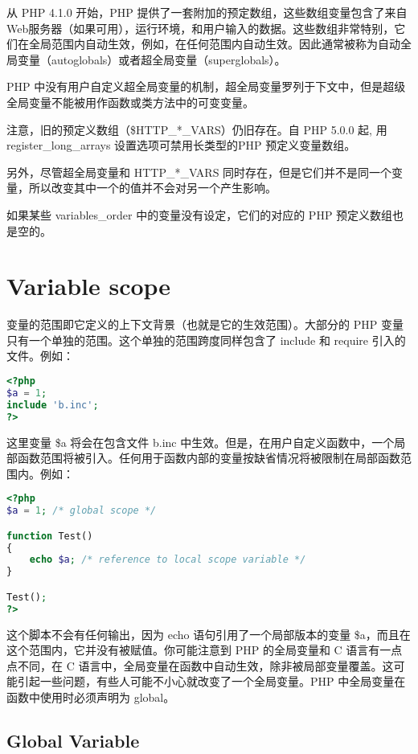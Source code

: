 从 PHP 4.1.0 开始，PHP 提供了一套附加的预定数组，这些数组变量包含了来自Web服务器（如果可用），运行环境，和用户输入的数据。这些数组非常特别，它们在全局范围内自动生效，例如，在任何范围内自动生效。因此通常被称为自动全局变量（autoglobals）或者超全局变量（superglobals）。

PHP 中没有用户自定义超全局变量的机制，超全局变量罗列于下文中，但是超级全局变量不能被用作函数或类方法中的可变变量。

注意，旧的预定义数组（\$HTTP\_*\_VARS）仍旧存在。自 PHP 5.0.0 起, 用 register\_long\_arrays 设置选项可禁用长类型的PHP 预定义变量数组。

另外，尽管超全局变量和 HTTP\_*\_VARS 同时存在，但是它们并不是同一个变量，所以改变其中一个的值并不会对另一个产生影响。

如果某些 variables\_order 中的变量没有设定，它们的对应的 PHP 预定义数组也是空的。


\section{Variable scope}


变量的范围即它定义的上下文背景（也就是它的生效范围）。大部分的 PHP 变量只有一个单独的范围。这个单独的范围跨度同样包含了 include 和 require 引入的文件。例如：


\begin{lstlisting}[language=PHP]
<?php
$a = 1;
include 'b.inc';
?>
\end{lstlisting}

这里变量 \$a 将会在包含文件 b.inc 中生效。但是，在用户自定义函数中，一个局部函数范围将被引入。任何用于函数内部的变量按缺省情况将被限制在局部函数范围内。例如：

\begin{lstlisting}[language=PHP]
<?php
$a = 1; /* global scope */

function Test()
{
    echo $a; /* reference to local scope variable */
}

Test();
?>
\end{lstlisting}

这个脚本不会有任何输出，因为 echo 语句引用了一个局部版本的变量 \$a，而且在这个范围内，它并没有被赋值。你可能注意到 PHP 的全局变量和 C 语言有一点点不同，在 C 语言中，全局变量在函数中自动生效，除非被局部变量覆盖。这可能引起一些问题，有些人可能不小心就改变了一个全局变量。PHP 中全局变量在函数中使用时必须声明为 global。


\subsection{Global Variable}


